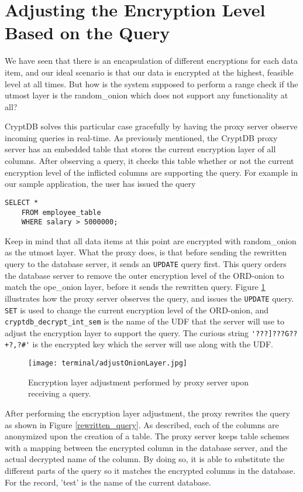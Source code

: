 \section{Adjusting the Encryption Level Based on the Query}
\label{adjust_enc_level}

We have seen that there is an encapsulation of different encryptions for each data item, and our ideal scenario is that our data is encrypted at the highest, feasible level at all times.  But how is the system supposed to perform a range check if the utmost layer is the \gls{random_onion} which does not support any functionality at all?

CryptDB solves this particular case gracefully by having the proxy server observe incoming queries in real-time. As previously mentioned, the CryptDB proxy server has an embedded table that stores the current encryption layer of all columns. After observing a query, it checks this table whether or not the current encryption level of the inflicted columns are supporting the query. For example in our sample application, the user has issued the query 
\begin{verbatim}
SELECT *
	FROM employee_table
	WHERE salary > 5000000;
\end{verbatim}

Keep in mind that all data items at this point are encrypted with \gls{random_onion} as the utmost layer. What the proxy does, is that before sending the rewritten query to the database server, it sends an \verb!UPDATE! query first. This query orders the database server to remove the outer encryption level of the ORD-onion to match the \gls{ope_onion} layer, before it sends the rewritten query. Figure \ref{ope_layer_adjustment} illustrates how the proxy server observes the query, and issues the \verb!UPDATE! query. \verb!SET! is used to change the current encryption level of the ORD-onion, and \verb!cryptdb_decrypt_int_sem! is the name of the UDF that the server will use to adjust the encryption layer to  support the query. The curious string \verb!'???]???G??+?,?#'! is the encrypted key which the server will use along with the UDF.

\begin{figure}[h]
	\texttt{[image: terminal/adjustOnionLayer.jpg]}
	\caption{Encryption layer adjustment performed by proxy server upon receiving a query.}
	\label{ope_layer_adjustment}
\end{figure}

After performing the encryption layer adjustment, the proxy rewrites the query as shown in Figure \ref{rewritten_query}. As described, each of the columns are anonymized upon the creation of a table. The proxy server keeps table schemes with a mapping between the encrypted column in the database server, and the actual decrypted name of the column. By doing so, it is able to substitute the different parts of the query so it matches the encrypted columns in the database. For the record, 'test' is the name of the current database.  

